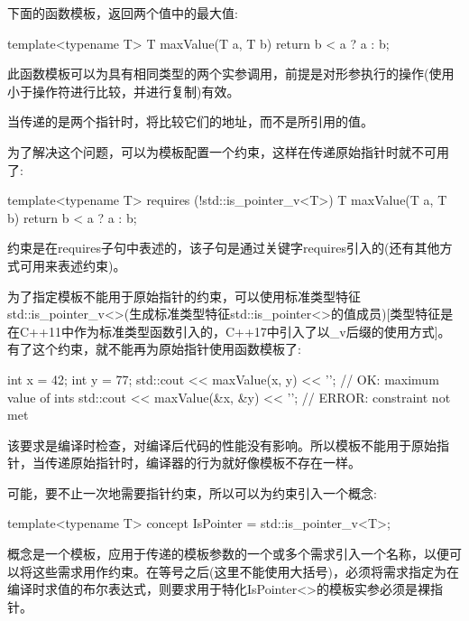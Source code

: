 

下面的函数模板，返回两个值中的最大值:

\begin{cpp}
template<typename T>
T maxValue(T a, T b) {
	return b < a ? a : b;
}
\end{cpp}

此函数模板可以为具有相同类型的两个实参调用，前提是对形参执行的操作(使用小于操作符进行比较，并进行复制)有效。

当传递的是两个指针时，将比较它们的地址，而不是所引用的值。




为了解决这个问题，可以为模板配置一个约束，这样在传递原始指针时就不可用了:

\begin{cpp}
template<typename T>
requires (!std::is_pointer_v<T>)
T maxValue(T a, T b)
{
	return b < a ? a : b;
}
\end{cpp}

约束是在requires子句中表述的，该子句是通过关键字requires引入的(还有其他方式可用来表述约束)。

为了指定模板不能用于原始指针的约束，可以使用标准类型特征std::is\_pointer\_v<>(生成标准类型特征std::is\_pointer<>的值成员)[类型特征是在C++11中作为标准类型函数引入的，C++17中引入了以\_v后缀的使用方式]。有了这个约束，就不能再为原始指针使用函数模板了:

\begin{cpp}
int x = 42;
int y = 77;
std::cout << maxValue(x, y) << '\n'; // OK: maximum value of ints
std::cout << maxValue(&x, &y) << '\n'; // ERROR: constraint not met
\end{cpp}

该要求是编译时检查，对编译后代码的性能没有影响。所以模板不能用于原始指针，当传递原始指针时，编译器的行为就好像模板不存在一样。


可能，要不止一次地需要指针约束，所以可以为约束引入一个概念:

\begin{cpp}
template<typename T>
concept IsPointer = std::is_pointer_v<T>;
\end{cpp}

概念是一个模板，应用于传递的模板参数的一个或多个需求引入一个名称，以便可以将这些需求用作约束。在等号之后(这里不能使用大括号)，必须将需求指定为在编译时求值的布尔表达式，则要求用于特化IsPointer<>的模板实参必须是裸指针。

